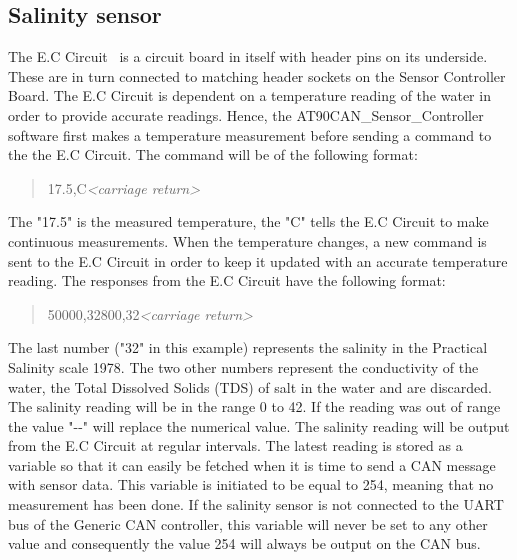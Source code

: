 \subsection{Salinity sensor}
The E.C Circuit~\cite{web:ec_circuit} is a circuit board in itself with header pins on its underside. These are in turn connected to matching  header sockets on the Sensor Controller Board. \newline
The E.C Circuit is dependent on a temperature reading of the water in order to provide accurate readings. Hence, the AT90CAN\_Sensor\_Controller software first makes a temperature measurement before sending a command to the the E.C Circuit. The command will be of the following format:

\begin{quote}
17.5,C\emph{<carriage return>}
\end{quote}

The "17.5" is the measured temperature, the "C" tells the E.C Circuit to make continuous measurements. When the temperature changes, a new command is sent to the E.C Circuit in order to keep it updated with an accurate temperature reading. \newline
The responses from the E.C Circuit have the following format:

\begin{quote}
50000,32800,32\emph{<carriage return>}
\end{quote}

The last number ("32" in this example) represents the salinity in the Practical Salinity scale 1978. The two other numbers represent the conductivity of the water, the Total Dissolved Solids (TDS) of salt in the water and are discarded. The salinity reading will be in the range 0 to 42. If the reading was out of range the value "\--\--" will replace the numerical value. \newline
The salinity reading will be output from the E.C Circuit at regular intervals. The latest reading is stored as a variable so that it can easily be fetched when it is time to send a CAN message with sensor data. This variable is initiated to be equal to 254, meaning that no measurement has been done. If the salinity sensor is not connected to the UART bus of the Generic CAN controller, this variable will never be set to any other value and consequently the value 254 will always be output on the CAN bus.

